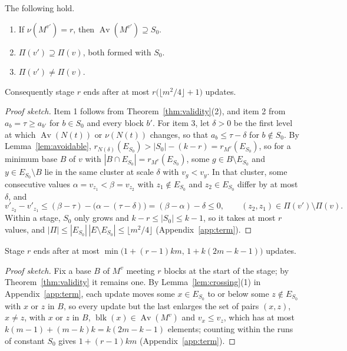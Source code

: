 \documentclass[runningheads,envcountsame]{llncs}
\newcommand{\blk}{\operatorname{blk}}
\newcommand{\Av}{\operatorname{Av}}
\begin{document}
\begin{theorem}[Potential]
\label{thm:potential}
The following hold.
\begin{enumerate}
  \item If $\nu(M^{v'})=r$, then $\Av(M^{v'})\supseteq S_0$.
  \item $\Pi(v')\supseteq\Pi(v)$, both formed with $S_0$.
  \item $\Pi(v')\ne\Pi(v)$.
\end{enumerate}
Consequently stage $r$ ends after at most $r\bigl(\lfloor m^{2}/4\rfloor+1\bigr)$
updates.
\end{theorem}

\begin{proof}[Proof sketch]
Item 1 follows from Theorem~\ref{thm:validity}(2), and item 2 from
$a_b=\tau\ge a_{b'}$ for $b\in S_0$ and every block $b'$.  For item 3, let
$\delta>0$ be the first level at which $\Av(N(t))$ or $\nu(N(t))$ changes, so
that $a_b\le\tau-\delta$ for $b\notin S_0$.  By Lemma~\ref{lem:avoidable},
$r_{N(\delta)}(E_{S_0})>|S_0|-(k-r)=r_{M^{v}}(E_{S_0})$, so for a minimum base $B$
of $v$ with $|B\cap E_{S_0}|=r_{M^{v}}(E_{S_0})$,
some $g\in B\setminus E_{S_0}$ and $y\in E_{S_0}\setminus B$ lie in the same cluster
at scale $\delta$ with $v_g<v_y$.  In that cluster, some consecutive values
$\alpha=v_{z_1}<\beta=v_{z_2}$ with
$z_1\notin E_{S_0}$ and $z_2\in E_{S_0}$ differ by at most $\delta$, and
\[
  v'_{z_2}-v'_{z_1}\le(\beta-\tau)-\bigl(\alpha-(\tau-\delta)\bigr)=(\beta-\alpha)-\delta\le0,
  \qquad(z_2,z_1)\in\Pi(v')\setminus\Pi(v).
\]
Within a stage, $S_0$ only grows and $k-r\le|S_0|\le k-1$, so it takes at most
$r$ values, and $|\Pi|\le|E_{S_0}|\,|E\setminus E_{S_0}|\le\lfloor m^{2}/4\rfloor$
(Appendix~\ref{app:term}).
\end{proof}

\begin{theorem}
\label{thm:stagelength}
Stage $r$ ends after at most $\min\bigl(1+(r-1)km,\,1+k(2m-k-1)\bigr)$ updates.
\end{theorem}

\begin{proof}[Proof sketch]
Fix a base $B$ of $M^{v}$ meeting $r$ blocks at the start of the stage; by
Theorem~\ref{thm:validity} it remains one.  By Lemma~\ref{lem:crossing}(1) in Appendix~\ref{app:term}, each
update moves some $x\in E_{S_0}$ to or below some $z\notin E_{S_0}$ with $x$ or
$z$ in $B$, so every update but the last enlarges
the set of pairs $(x,z)$, $x\ne z$, with $x$ or $z$ in $B$, $\blk(x)\in\Av(M^{v})$
and $v_x\le v_z$, which has at most $k(m-1)+(m-k)k=k(2m-k-1)$ elements; counting
within the runs of constant $S_0$ gives $1+(r-1)km$ (Appendix~\ref{app:term}).
\end{proof}
\end{document}
